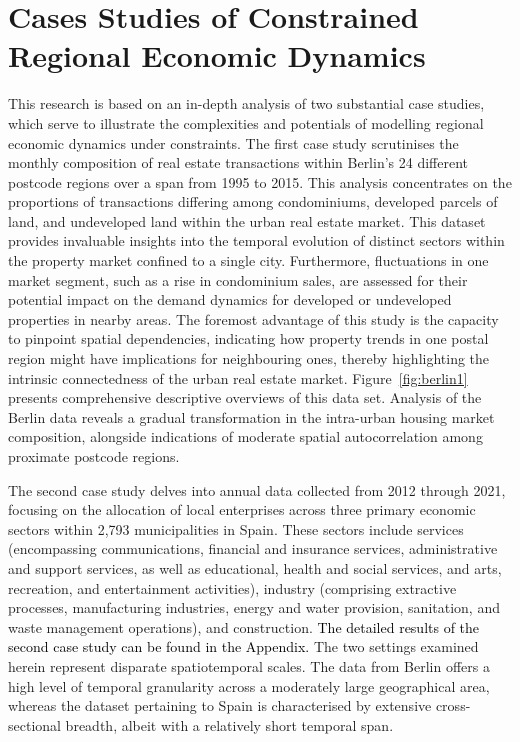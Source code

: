 \documentclass[12pt]{article}
\theoremstyle{plain}
\theoremstyle{definition}
\begin{document}
\section{Cases Studies of Constrained Regional Economic Dynamics}\label{sec:motivation}

This research is based on an in-depth analysis of two substantial case studies, which serve to illustrate the complexities and potentials of modelling regional economic dynamics under constraints. The first case study scrutinises the monthly composition of real estate transactions within Berlin's 24 different postcode regions over a span from 1995 to 2015. This analysis concentrates on the proportions of transactions differing among condominiums, developed parcels of land, and undeveloped land within the urban real estate market. This dataset provides invaluable insights into the temporal evolution of distinct sectors within the property market confined to a single city. Furthermore, fluctuations in one market segment, such as a rise in condominium sales, are assessed for their potential impact on the demand dynamics for developed or undeveloped properties in nearby areas. The foremost advantage of this study is the capacity to pinpoint spatial dependencies, indicating how property trends in one postal region might have implications for neighbouring ones, thereby highlighting the intrinsic connectedness of the urban real estate market. Figure~\ref{fig:berlin1} presents comprehensive descriptive overviews of this data set. Analysis of the Berlin data reveals a gradual transformation in the intra-urban housing market composition, alongside indications of moderate spatial autocorrelation among proximate postcode regions. %


The second case study delves into annual data collected from 2012 through 2021, focusing on the allocation of local enterprises across three primary economic sectors within 2,793 municipalities in Spain. These sectors include {services} (encompassing communications, financial and insurance services, administrative and support services, as well as educational, health and social services, and arts, recreation, and entertainment activities), {industry} (comprising extractive processes, manufacturing industries, energy and water provision, sanitation, and waste management operations), and {construction}. \textcolor{black}{The detailed results of the second case study can be found in the Appendix.} The two settings examined herein represent disparate spatiotemporal scales. The data from Berlin offers a high level of temporal granularity across a moderately large geographical area, whereas the dataset pertaining to Spain is characterised by extensive cross-sectional breadth, albeit with a relatively short temporal span. 
\end{document}
